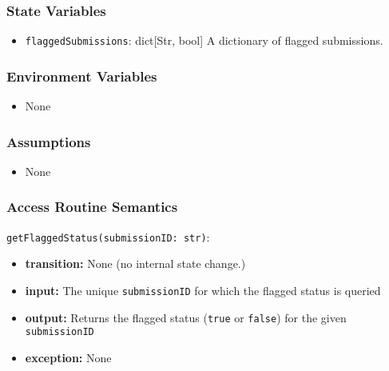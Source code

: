 \documentclass[12pt, titlepage]{article}
\begin{document}
\subsubsection{State Variables}

\begin{itemize}
    \item \texttt{flaggedSubmissions}: dict[Str, bool] A dictionary of flagged submissions.
\end{itemize}

\subsubsection{Environment Variables}

\begin{itemize}
  \item None
\end{itemize}

\subsubsection{Assumptions}

\begin{itemize}
    \item None
\end{itemize}

\subsubsection{Access Routine Semantics}

\noindent \texttt{getFlaggedStatus(submissionID: str)}:
\begin{itemize}
    \item \textbf{transition:} None (no internal state change.)
    \item \textbf{input:} The unique \texttt{submissionID} for which the flagged status is queried
    \item \textbf{output:} Returns the flagged status (\texttt{true} or \texttt{false}) for the given \texttt{submissionID}
    \item \textbf{exception:} None
\end{itemize}
\end{document}
